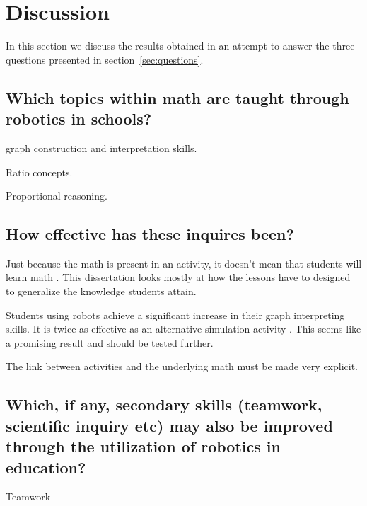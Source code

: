 \section*{Discussion}
In this section we discuss the results obtained in an attempt to answer the three questions presented in section~\ref{sec:questions}.

\subsection*{Which topics within math are taught through robotics in schools?}
 graph construction and interpretation skills.

\bigskip\noindent
{} Ratio concepts. 

\bigskip\noindent
{} Proportional reasoning.

\subsection*{How effective has these inquires been?}
Just because the math is present in an activity, it doesn't mean that students will learn math . This dissertation looks mostly at how the lessons have to designed to generalize the knowledge students attain.

Students using robots achieve a significant increase in their graph interpreting skills. It is twice as effective as an alternative simulation activity . This seems like a promising result and should be tested further. 

The link between activities and the underlying math must be made very explicit. 





\subsection*{Which, if any, secondary skills (teamwork, scientific inquiry etc) may also be improved through the utilization of robotics in education?}

Teamwork \cite{mitnik2009collaborative, }

